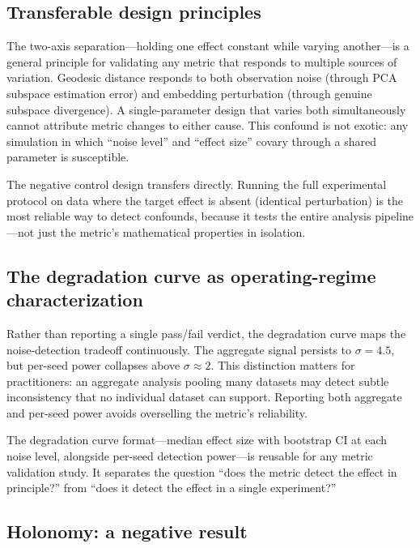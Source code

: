 \documentclass[11pt]{article}
\begin{document}
\subsection{Transferable design principles}

The two-axis separation---holding one effect constant while varying
another---is a general principle for validating any metric that
responds to multiple sources of variation.  Geodesic distance
responds to both observation noise (through PCA subspace
estimation error) and embedding perturbation (through genuine
subspace divergence).  A single-parameter design that varies both
simultaneously cannot attribute metric changes to either cause.
This confound is not exotic: any simulation in which ``noise
level'' and ``effect size'' covary through a shared parameter is
susceptible.

The negative control design transfers directly.  Running the full
experimental protocol on data where the target effect is absent
(identical perturbation) is the most reliable way to detect
confounds, because it tests the entire analysis pipeline---not
just the metric's mathematical properties in isolation.

\subsection{The degradation curve as operating-regime
  characterization}

Rather than reporting a single pass/fail verdict, the degradation
curve maps the noise-detection tradeoff continuously.  The
aggregate signal persists to $\sigma = 4.5$, but per-seed power
collapses above $\sigma \approx 2$.  This distinction matters for
practitioners: an aggregate analysis pooling many datasets may
detect subtle inconsistency that no individual dataset can support.
Reporting both aggregate and per-seed power avoids overselling
the metric's reliability.

The degradation curve format---median effect size with bootstrap CI
at each noise level, alongside per-seed detection power---is
reusable for any metric validation study.  It separates the
question ``does the metric detect the effect in principle?'' from
``does it detect the effect in a single experiment?''

\subsection{Holonomy: a negative result}
\end{document}

